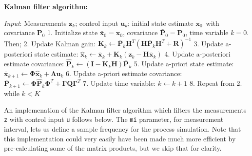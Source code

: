 \documentclass[11pt]{article}
\begin{document}
\textbf{Kalman filter algorithm:}

\emph{Input}: Measurements \(\mathbf{z}_k\); control input
\(\mathbf{u}_k\); initial state estimate \(\mathbf{x}_0\)~with
covariance \(\mathbf{P}_0\) 1. Initialize state
\(\bar{\mathbf{x}}_0 = \mathbf{x}_0\), covariance
\(\bar{\mathbf{P}}_0 = \mathbf{P}_0\), time variable \(k = 0\). Then; 2.
Update Kalman gain:
\(\mathbf{K}_k \leftarrow \bar{\mathbf{P}}_k \mathbf{H}^T (\mathbf{H} \bar{\mathbf{P}}_k \mathbf{H}^T + \mathbf{R})^{-1}\)
3. Update a-posteriori state estimate:
\(\hat{\mathbf{x}}_k \leftarrow \bar{\mathbf{x}}_k + \mathbf{K}_k (\mathbf{z}_k - \mathbf{H}\bar{\mathbf{x}}_k)\)
4. Update a-posteriori estimate covariance:
\(\hat{\mathbf{P}}_k \leftarrow (\mathbf{I} - \mathbf{K}_k \mathbf{H}) \bar{\mathbf{P}}_k\)
5. Update a-priori state estimate:
\(\bar{\mathbf{x}}_{k+1} \leftarrow \mathbf{\Phi} \hat{\mathbf{x}}_k + \mathbf{\Lambda} \mathbf{u}_k\)
6. Update a-priori estimate covariance:
\(\bar{\mathbf{P}}_{k+1} \leftarrow \mathbf{\Phi} \hat{\mathbf{P}}_k \mathbf{\Phi}^T + \mathbf{\Gamma} \mathbf{Q} \mathbf{\Gamma}^T\)
7. Update time variable: \(k \leftarrow k + 1\) 8. Repeat from 2. while
\(k < K\)

An implemenation of the Kalman filter algorithm which filters the
measurements \texttt{z} with control input \texttt{u} follows below. The
\texttt{mi} parameter, for measurement interval, lets us define a sample
frequency for the process simulation. Note that this implementation
could very easily have been made much more efficient by pre-calculating
some of the matrix products, but we skip that for clarity.
\end{document}
